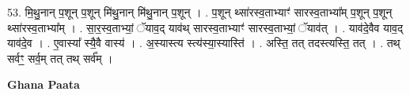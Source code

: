 \documentclass[17pt]{extarticle}
\begin{document}
53. मि॒थु॒नान् प॒शून् प॒शून् मि॑थु॒नान् मि॑थु॒नान् प॒शून् । . प॒शून् थ्सा॑रस्व॒ताभ्याꣳ॑ सारस्व॒ताभ्या᳚म् प॒शून् प॒शून् थ्सा॑रस्व॒ताभ्या᳚म् । . सा॒र॒स्व॒ताभ्यां॒ ॅयाव॒द् याव॑थ् सारस्व॒ताभ्याꣳ॑ सारस्व॒ताभ्यां॒ ॅयाव॑त् । . याव॑दे॒वैव याव॒द् याव॑दे॒व । . ए॒वास्या᳚ स्यै॒वै वास्य॑ । . अ॒स्यास्त्य स्त्य॑स्या॒स्यास्ति॑ । . अस्ति॒ तत् तदस्त्यस्ति॒ तत् । . तथ् सर्वꣳ॒॒ सर्व॒म् तत् तथ् सर्व᳚म् । \newline

\textbf{Ghana Paata } \newline
\end{document}
